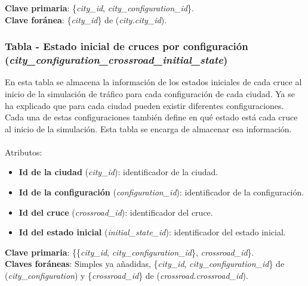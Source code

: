 \textbf{Clave primaria}: \{\textit{city\_id}, \textit{city\_configuration\_id}\}. \\
\textbf{Clave foránea}: \{\textit{city\_id}\} de (\textit{city.city\_id}).

\subsubsection{Tabla - Estado inicial de cruces por configuración\\ (\textit{city\_configuration\_crossroad\_initial\_state})}
En esta tabla se almacena la información de los estados iniciales de cada cruce al inicio de la simulación de tráfico para cada configuración de cada ciudad. Ya se ha explicado que para cada ciudad pueden existir diferentes configuraciones. Cada una de estas configuraciones también define en qué estado está cada cruce al inicio de la simulación. Esta tabla se encarga de almacenar esa información. \\\\
Atributos:
\begin{itemize}
    \item \textbf{Id de la ciudad} (\textit{city\_id}): identificador de la ciudad.
    \item \textbf{Id de la configuración} (\textit{configuration\_id}): identificador de la configuración.
    \item \textbf{Id del cruce} (\textit{crossroad\_id}): identificador del cruce.
    \item \textbf{Id del estado inicial} (\textit{initial\_state\_id}): identificador del estado inicial.
\end{itemize}
\textbf{Clave primaria}: \{\{\textit{city\_id}, \textit{city\_configuration\_id}\}, \textit{crossroad\_id}\}. \\
\textbf{Claves foráneas}: Simples ya añadidas, \{\textit{city\_id}, \textit{city\_configuration\_id}\} \newline de (\textit{city\_configuration}) y \{\textit{crossroad\_id}\} de (\textit{crossroad.crossroad\_id}).

